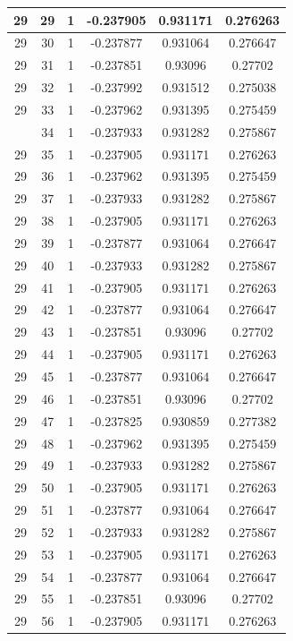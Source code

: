 \documentclass[12pt,a4paper]{article}
\numberwithin{equation}{section}
\numberwithin{figure}{section}
\numberwithin{table}{section}
\begin{document}
\begin{longtable}{|c|c|c|c|c|c|}
29 & 29 & 1 & -0.237905 & 0.931171 & 0.276263 \\ \hline
29 & 30 & 1 & -0.237877 & 0.931064 & 0.276647 \\ \hline
29 & 31 & 1 & -0.237851 & 0.93096 & 0.27702 \\ \hline
29 & 32 & 1 & -0.237992 & 0.931512 & 0.275038 \\ \hline
29 & 33 & 1 & -0.237962 & 0.931395 & 0.275459 \\ \hline
\pagebreak
29 & 34 & 1 & -0.237933 & 0.931282 & 0.275867 \\ \hline
29 & 35 & 1 & -0.237905 & 0.931171 & 0.276263 \\ \hline
29 & 36 & 1 & -0.237962 & 0.931395 & 0.275459 \\ \hline
29 & 37 & 1 & -0.237933 & 0.931282 & 0.275867 \\ \hline
29 & 38 & 1 & -0.237905 & 0.931171 & 0.276263 \\ \hline
29 & 39 & 1 & -0.237877 & 0.931064 & 0.276647 \\ \hline
29 & 40 & 1 & -0.237933 & 0.931282 & 0.275867 \\ \hline
29 & 41 & 1 & -0.237905 & 0.931171 & 0.276263 \\ \hline
29 & 42 & 1 & -0.237877 & 0.931064 & 0.276647 \\ \hline
29 & 43 & 1 & -0.237851 & 0.93096 & 0.27702 \\ \hline
29 & 44 & 1 & -0.237905 & 0.931171 & 0.276263 \\ \hline
29 & 45 & 1 & -0.237877 & 0.931064 & 0.276647 \\ \hline
29 & 46 & 1 & -0.237851 & 0.93096 & 0.27702 \\ \hline
29 & 47 & 1 & -0.237825 & 0.930859 & 0.277382 \\ \hline
29 & 48 & 1 & -0.237962 & 0.931395 & 0.275459 \\ \hline
29 & 49 & 1 & -0.237933 & 0.931282 & 0.275867 \\ \hline
29 & 50 & 1 & -0.237905 & 0.931171 & 0.276263 \\ \hline
29 & 51 & 1 & -0.237877 & 0.931064 & 0.276647 \\ \hline
29 & 52 & 1 & -0.237933 & 0.931282 & 0.275867 \\ \hline
29 & 53 & 1 & -0.237905 & 0.931171 & 0.276263 \\ \hline
29 & 54 & 1 & -0.237877 & 0.931064 & 0.276647 \\ \hline
29 & 55 & 1 & -0.237851 & 0.93096 & 0.27702 \\ \hline
29 & 56 & 1 & -0.237905 & 0.931171 & 0.276263 \\ \hline

\end{longtable}
\end{document}
